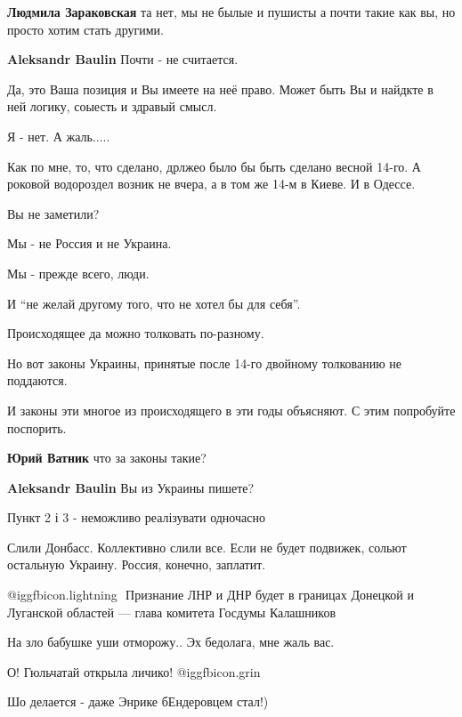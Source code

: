 \begin{itemize}
\begin{itemize}
\textbf{Людмила Зараковская} та нет, мы не былые и пушисты а почти такие как вы, но просто хотим стать другими.

\textbf{Aleksandr Baulin} Почти - не считается.
\end{itemize} %


Да, это Ваша позиция и Вы имеете на неё право. Может быть Вы и найдкте в ней
логику, соыесть и здравый смысл.

Я - нет. А жаль.....

Как по мне, то, что сделано, дрлжео было бы быть сделано весной 14-го. А
роковой водороздел возник не вчера, а в том же 14-м в Киеве. И в Одессе.

Вы не заметили?

Мы - не Россия и не Украина.

Мы - прежде всего, люди.

И \enquote{не желай другому того, что не хотел бы для себя}.

Происходящее да можно толковать по-разному.

Но вот законы Украины, принятые после 14-го двойному толкованию не поддаются.

И законы эти многое из происходящего в эти годы объясняют. С этим попробуйте
поспорить.

\begin{itemize} %
\textbf{Юрий Ватник} что за законы такие?

\textbf{Aleksandr Baulin} Вы из Украины пишете?
\end{itemize} %

Пункт 2 і 3 - неможливо реалізувати одночасно

Слили Донбасс. Коллективно слили все. Если не будет подвижек, сольют остальную Украину. Россия, конечно, заплатит.

 @igg{fbicon.lightning} ️ Признание ЛНР и ДНР будет в границах Донецкой и Луганской областей — глава
 комитета Госдумы Калашников

На зло бабушке уши отморожу.. Эх бедолага, мне жаль вас.

О! Гюльчатай открыла личико!  @igg{fbicon.grin} 

Шо делается - даже Энрике бЕндеровцем стал!)


\end{itemize}
